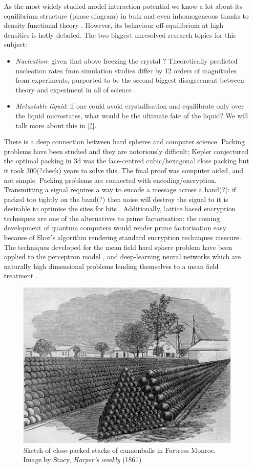 \documentclass[11pt,twoside]{report}
\begin{document}
As the most widely studied model interaction potential we know a lot about its equilibrium structure (phase diagram) in bulk and even inhomogeneous thanks to density functional theory \cite{?,?,?}.
However, its behaviour off-equilibrium at high densities is hotly debated.
The two biggest unresolved research topics for this subject:
\begin{itemize}
\item \emph{Nucleation}: given that above freezing the crystal ? Theoretically predicted nucleation rates from simulation studies differ by 12 orders of magnitudes from experiments, purported to be the second biggest disagreement between theory and experiment in all of science \cite{?}.
\item \emph{Metastable liquid}: if one could avoid crystallisation and equilibrate only over the liquid microstates, what would be the ultimate fate of the liquid?
  We will talk more about this in \ref{?}.
\end{itemize}

There is a deep connection between hard spheres and computer science.
Packing problems have been studied \cite{Cohn,Conway,Sloane} and they are notoriously difficult; Kepler conjectured the optimal packing in 3d was the face-centred cubic/hexagonal close packing but it took 300(?check) years to solve this.
The final proof was computer aided, and not simple.
Packing problems are connected with encoding/encryption.
Transmitting a signal requires a way to encode a message across a band(?): if packed too tightly on the band(?) then noise will destroy the signal to it is desirable to optimise the sites for bits \cite{Cohn,?,?}.
Additionally, lattice based encryption techniques are one of the alternatives to prime factorisation: the coming development of quantum computers \cite{?,?} would render prime factorisation easy because of Shor's algorithm \cite{Shor?} rendering standard encryption techniques insecure.
The techniques developed for the mean field hard sphere problem have been applied to the perceptron model \cite{?}, and deep-learning neural networks which are naturally high dimensional problems lending themselves to a mean field treatment \cite{?}.

\begin{figure}
  \includegraphics[width=0.75\linewidth,outer]{cannonballs}
  \caption[Close packed cannonballs]{
    Sketch of close-packed stacks of cannonballs in Fortress Monroe.
    Image by Stacy, \emph{Harper's weekly} (1861)}
  \label{fig:fcc}
\end{figure}
\end{document}
